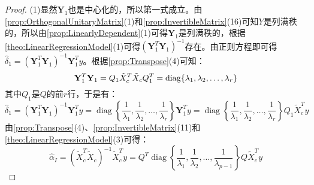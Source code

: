 \begin{proof}
	(1)显然$\mathbf{Y}_1$也是中心化的，所以第一式成立。由\cref{prop:OrthogonalUnitaryMatrix}(1)和\cref{prop:InvertibleMatrix}(16)可知$Y$是列满秩的，所以由\cref{prop:LinearlyDependent}(1)可得$\mathbf{Y}_1$是列满秩的，根据\cref{theo:LinearRegressionModel}(1)可得$(\mathbf{Y}_1^T\mathbf{Y}_1)^{-1}$存在。由正则方程即可得$\hat{\delta}_1=(\mathbf{Y}_1^T\mathbf{Y}_1)^{-1}\mathbf{Y}_1^Ty$。根据\cref{prop:Transpose}(4)可知：
	\begin{equation*}
		\mathbf{Y}_1^T\mathbf{Y}_1=Q_1\tilde{X}_c^T\tilde{X}_cQ_1^T=\operatorname{diag}\{\lambda_1, \lambda_2, \dots, \lambda_{r}\}
	\end{equation*}
	其中$Q_1$是$Q$的前$r$行，于是有：
	\begin{equation*}
		\hat{\delta}_1=(\mathbf{Y}_1^T\mathbf{Y}_1)^{-1}\mathbf{Y}_1^Ty=\operatorname{diag}\left\{\dfrac{1}{\lambda_{1}},\dfrac{1}{\lambda_{2}},\dots,\dfrac{1}{\lambda_{r}}\right\}\mathbf{Y}_1^Ty=\operatorname{diag}\left\{\dfrac{1}{\lambda_{1}},\dfrac{1}{\lambda_{2}},\dots,\dfrac{1}{\lambda_{r}}\right\}Q_1\tilde{X}_c^Ty
	\end{equation*}
	由\cref{prop:Transpose}(4)、\cref{prop:InvertibleMatrix}(11)和\cref{theo:LinearRegressionModel}(3)可得：
	\begin{equation*}
		\hat{\alpha}_I=(\tilde{X}_c^T\tilde{X}_c)^{-1}\tilde{X}_c^Ty=Q^T\operatorname{diag}\left\{\dfrac{1}{\lambda_{1}},\dfrac{1}{\lambda_{2}},\dots,\dfrac{1}{\lambda_{p-1}}\right\}Q\tilde{X}_c^Ty
	\end{equation*}
\end{proof}







